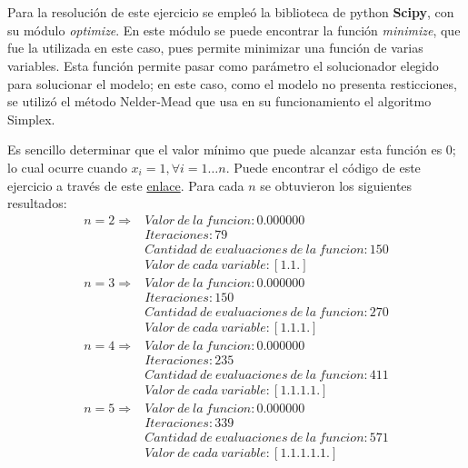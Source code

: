 \documentclass[titlepage, 11pt]{scrartcl}
\begin{document}
	\section{}{
		Para la resoluci\'on de este ejercicio se emple\'o la biblioteca de python \textbf{Scipy}, con su m\'odulo \textit{optimize}. En este m\'odulo se puede encontrar la funci\'on \textit{minimize}, que fue la utilizada en este caso, pues permite minimizar una funci\'on de varias variables. Esta funci\'on permite pasar como par\'ametro el solucionador elegido para solucionar el modelo; en este caso, como el modelo no presenta resticciones, se utiliz\'o el m\'etodo Nelder-Mead que usa en su funcionamiento el algoritmo Simplex.
		
		Es sencillo determinar que el valor m\'inimo que puede alcanzar esta funci\'on es 0; lo cual ocurre cuando $x_i = 1, \forall i = 1 \ldots n$. Puede encontrar el c\'odigo de este ejercicio a trav\'es de este \href{lab1_ex2.py}{enlace}. Para cada $n$ se obtuvieron los siguientes resultados:
		\begin{align*}
			n = 2 \Rightarrow& Valor \ de \ la \ funcion: 0.000000\\
			&Iteraciones: 79\\
			&Cantidad \ de \ evaluaciones \ de \ la  \ funcion: 150\\
			&Valor \ de \ cada \ variable: [1. 1.]\\
			n = 3 \Rightarrow& Valor \ de \ la \ funcion: 0.000000\\
			&Iteraciones: 150\\
			&Cantidad \ de \ evaluaciones \ de \ la  \ funcion: 270\\
			&Valor \ de \ cada \ variable: [1. 1. 1.]\\
			n = 4 \Rightarrow& Valor \ de \ la \ funcion: 0.000000\\
			&Iteraciones: 235\\
			&Cantidad \ de \ evaluaciones \ de \ la  \ funcion: 411\\
			&Valor \ de \ cada \ variable: [1. 1. 1. 1.]\\
			n = 5 \Rightarrow& Valor \ de \ la \ funcion: 0.000000\\
			&Iteraciones: 339\\
			&Cantidad \ de \ evaluaciones \ de \ la  \ funcion: 571\\
			&Valor \ de \ cada \ variable: [1. 1. 1. 1. 1.]\\
		\end{align*}
	
	}
\end{document}
